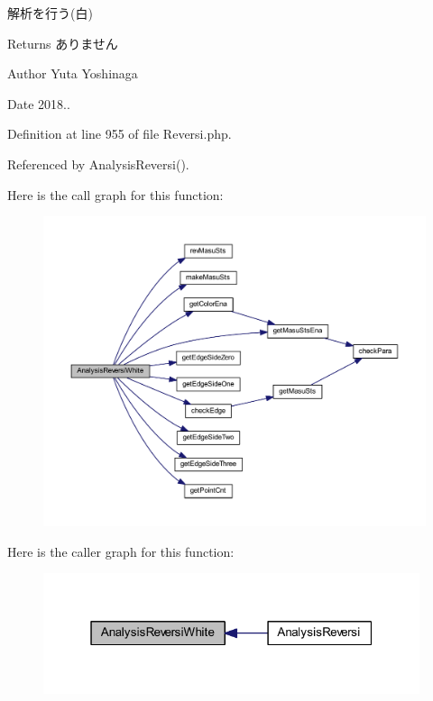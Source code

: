 解析を行う(白) 

\begin{DoxyReturn}{Returns}
ありません 
\end{DoxyReturn}
\begin{DoxyAuthor}{Author}
Yuta Yoshinaga 
\end{DoxyAuthor}
\begin{DoxyDate}{Date}
2018.. 
\end{DoxyDate}


Definition at line 955 of file Reversi.\+php.



Referenced by Analysis\+Reversi().

Here is the call graph for this function\+:
\nopagebreak
\begin{figure}[H]
\begin{center}
\leavevmode
\includegraphics[width=350pt]{class_reversi_a3c30afb2509b0782b1c22a8770c68c48_cgraph}
\end{center}
\end{figure}
Here is the caller graph for this function\+:
\nopagebreak
\begin{figure}[H]
\begin{center}
\leavevmode
\includegraphics[width=313pt]{class_reversi_a3c30afb2509b0782b1c22a8770c68c48_icgraph}
\end{center}
\end{figure}
\mbox{\label{class_reversi_acd2c64ea43cc26407ad64920a183446b}} 
